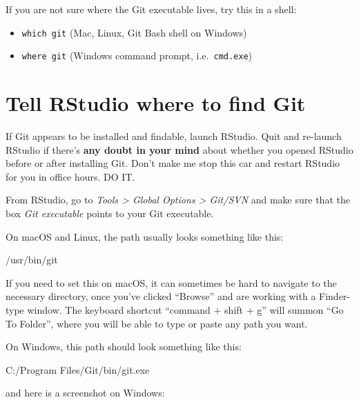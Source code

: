\documentclass[
]{book}
\newenvironment{Shaded}{\begin{snugshade}}{\end{snugshade}}
\newcommand{\ExtensionTok}[1]{#1}
\newcommand{\NormalTok}[1]{#1}
\begin{document}
If you are not sure where the Git executable lives, try this in a shell:

\begin{itemize}
\item
  \texttt{which\ git} (Mac, Linux, Git Bash shell on Windows)
\item
  \texttt{where\ git} (Windows command prompt, i.e.~\texttt{cmd.exe})
\end{itemize}

\section{Tell RStudio where to find Git}\label{tell-rstudio-where-to-find-git}

If Git appears to be installed and findable, launch RStudio.
Quit and re-launch RStudio if there's \textbf{any doubt in your mind} about whether you opened RStudio before or after installing Git.
Don't make me stop this car and restart RStudio for you in office hours.
DO IT.

From RStudio, go to \emph{Tools \textgreater{} Global Options \textgreater{} Git/SVN} and make sure that the box \emph{Git executable} points to your Git executable.

On macOS and Linux, the path usually looks something like this:

\begin{Shaded}
\begin{Highlighting}[]
\NormalTok{/usr/bin/git}
\end{Highlighting}
\end{Shaded}

If you need to set this on macOS, it can sometimes be hard to navigate to the necessary directory, once you've clicked ``Browse'' and are working with a Finder-type window.
The keyboard shortcut ``command + shift + g'' will summon ``Go To Folder'', where you will be able to type or paste any path you want.

On Windows, this path should look something like this:

\begin{Shaded}
\begin{Highlighting}[]
\ExtensionTok{C:/Program}\NormalTok{ Files/Git/bin/git.exe}
\end{Highlighting}
\end{Shaded}

and here is a screenshot on Windows:
\end{document}

